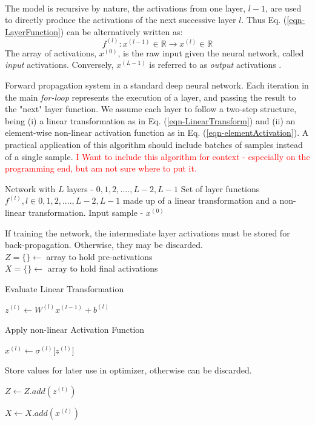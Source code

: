 \documentclass[12pt,letterpaper]{article}
\begin{document}
\paragraph*{}The model is recursive by nature, the activations from one layer, $l-1$, are used to directly produce the activations of the next successive layer $l$. Thus Eq. (\ref{eqn-LayerFunction}) can be alternatively written as:
\begin{equation}
\label{eqn-altLayerFunction}
f^{(l)} : x^{(l-1)} \in \mathbb{R} \rightarrow x^{(l)} \in \mathbb{R}
\end{equation}
The array of activations, $x^{(0)}$, is the raw input given the neural network, called \textit{input} activations. Conversely, $x^{(L-1)}$ is referred to as \textit{output} activations \cite{Geron,James,Loy}.

\begin{algorithm}[H]
\caption{Forward propagation system in a standard deep neural network. Each iteration in the main \textit{for-loop} represents the execution of a layer, and passing the result to the "next" layer function. We assume each layer to follow a two-step structure, being (i) a linear transformation as in Eq. (\ref{eqn-LinearTransform}) and (ii) an element-wise non-linear activation function as in Eq. (\ref{eqn-elementActivation}).  A practical application of this algorithm should include batches of samples instead of a single sample.
\textcolor{red}{I Want to include this algorithm for context - especially on the programming end, but am not sure where to put it. }}
\label{algFeedForward}

\begin{algorithmic}
\REQUIRE Network with $L$ layers - $0,1,2,....,L-2,L-1$
\REQUIRE Set of layer functions $f^{(l)}, l \in 0,1,2,....,L-2,L-1$ made up of a linear transformation and a non-linear transformation.
\REQUIRE Input sample - $x^{(0)}$

If training the network, the intermediate layer activations must be stored for back-propagation. Otherwise, they may be discarded. \\
$Z = \{\} \leftarrow$ array to hold pre-activations \\
$X = \{\} \leftarrow$ array to hold final activations \\

	\item Evaluate Linear Transformation
	\item $z^{(l)} \leftarrow W^{(l)} x^{(l-1)} + b^{(l)}$ 
	\item Apply non-linear Activation Function
	\item $x^{(l)} \leftarrow \sigma^{(l)} \big[ z^{(l)} \big]$ 
	\item Store values for later use in optimizer, otherwise can be discarded.
	\item $Z \leftarrow Z.add(z^{(l)})$
	\item $X \leftarrow X.add(x^{(l)})$
\ENDFOR


\end{algorithmic}
\end{algorithm}
\end{document}
